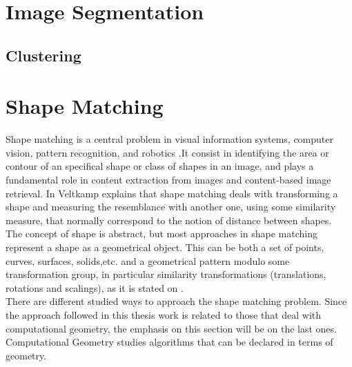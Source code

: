 \section{Image Segmentation}
\label{sec:segmentation}

\subsection{Clustering}
\label{sec:clustering}

\section{Shape Matching}
\label{sec:shapefitting}

Shape matching is a central problem in visual information systems,
computer vision, pattern recognition, and robotics \cite{matchingbook}.It consist in identifying the area or contour of an specifical
 shape or class of shapes in an image, and plays a fundamental
role in content extraction from images and content-based image
retrieval. In \cite{matching2} Veltkamp explains that shape 
matching deals with transforming a shape and measuring the 
resemblance with another one, using some similarity measure, that 
normally correspond to the notion of distance between shapes.\\
The concept of shape is abstract, but most approaches in 
shape matching represent a shape as a geometrical object.
This can be both a set of points, curves, surfaces, solids,etc.
and a geometrical pattern modulo some transformation group,
in particular similarity transformations (translations, rotations 
and scalings), as it is stated on \cite{matching2}.\\

There are different studied ways to approach the shape matching 
problem. Since the approach followed in this thesis work
is related to those that deal with computational geometry, the
emphasis on this section will be on the last ones. Computational
Geometry studies algorithms that can be declared in terms of 
geometry.\\

